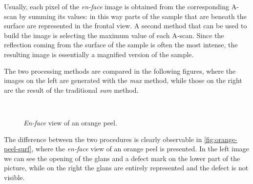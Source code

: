 Usually, each pixel of the \emph{en-face} image is obtained from the corresponding A-scan by summing its values: in this way parts of the sample that are beneath the surface are represented in the frontal view. A second method that can be used to build the image is selecting the maximum value of each A-scan. Since the reflection coming from the surface of the sample is often the most intense, the resulting image is essentially a magnified version of the sample. 

The two processing methods are compared in the following figures, where the images on the left are generated with the \emph{max} method, while those on the right are the result of the traditional \emph{sum} method. 

\begin{figure}[H]
	\myfloatalign
	\\
	\caption{\emph{En-face} view of an orange peel.}\label{fig:orange-peel-surf}
\end{figure}
The difference between the two procedures is clearly observable in \autoref{fig:orange-peel-surf}, where the \emph{en-face} view of an orange peel is presented. In the left image we can see the opening of the glans and a defect mark on the lower part of the picture, while on the right the glans are entirely represented and the defect is not visible. 

